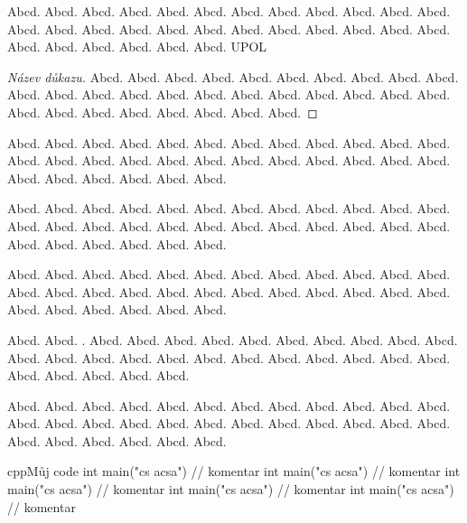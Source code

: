 \documentclass[12pt]{article}
\begin{document}

\begin{definition}
Abcd. Abcd. Abcd. Abcd. Abcd. Abcd. Abcd. Abcd. Abcd. Abcd. Abcd. Abcd. Abcd. Abcd. Abcd. Abcd. Abcd. Abcd. Abcd. Abcd. Abcd. Abcd. Abcd. Abcd. Abcd. Abcd. Abcd. Abcd. Abcd. Abcd. \gls{UPOL}
\end{definition}

\begin{proof}[Název důkazu]
Abcd. Abcd. Abcd. Abcd. Abcd. Abcd. Abcd. Abcd. Abcd. Abcd. Abcd. Abcd. Abcd. Abcd. Abcd. Abcd. Abcd. Abcd. Abcd. Abcd. Abcd. Abcd. Abcd. Abcd. Abcd. Abcd. Abcd. Abcd. Abcd. Abcd. 
\end{proof}

\begin{remark}
Abcd. Abcd. Abcd. Abcd. Abcd. Abcd. Abcd. Abcd. Abcd. Abcd. Abcd. Abcd. Abcd. Abcd. Abcd. Abcd. Abcd. Abcd. Abcd. Abcd. Abcd. Abcd. Abcd. Abcd. Abcd. Abcd. Abcd. Abcd. Abcd. Abcd. 
\end{remark}

\begin{example}
Abcd. Abcd. Abcd. Abcd. Abcd. Abcd. Abcd. Abcd. Abcd. Abcd. Abcd. Abcd. Abcd. Abcd. Abcd. Abcd. Abcd. Abcd. Abcd. Abcd. Abcd. Abcd. Abcd. Abcd. Abcd. Abcd. Abcd. Abcd. Abcd. Abcd. 
\end{example}

\begin{lemma}
Abcd. Abcd. Abcd. Abcd. Abcd. Abcd. Abcd. Abcd. Abcd. Abcd. Abcd. Abcd. Abcd. Abcd. Abcd. Abcd. Abcd. Abcd. Abcd. Abcd. Abcd. Abcd. Abcd. Abcd. Abcd. Abcd. Abcd. Abcd. Abcd. Abcd. 
\end{lemma}

\begin{consequence}
Abcd. Abcd. . Abcd. Abcd. Abcd. Abcd. Abcd. Abcd. Abcd. Abcd. Abcd. Abcd. Abcd. Abcd. Abcd. Abcd. Abcd. Abcd. Abcd. Abcd. Abcd. Abcd. Abcd. Abcd. Abcd. Abcd. Abcd. Abcd. Abcd. 
\end{consequence}

\begin{theorem}
Abcd. Abcd. Abcd. Abcd. Abcd. Abcd. Abcd. Abcd. Abcd. Abcd. Abcd. Abcd. Abcd. Abcd. Abcd. Abcd. Abcd. Abcd. Abcd. Abcd. Abcd. Abcd. Abcd. Abcd. Abcd. Abcd. Abcd. Abcd. Abcd. Abcd. 
\end{theorem}


\begin{upcode}{cpp}{}{Můj code}
int main("cs acsa") // komentar
int main("cs acsa") // komentar
int main("cs acsa") // komentar
int main("cs acsa") // komentar
int main("cs acsa") // komentar
\end{upcode}
\end{document}
